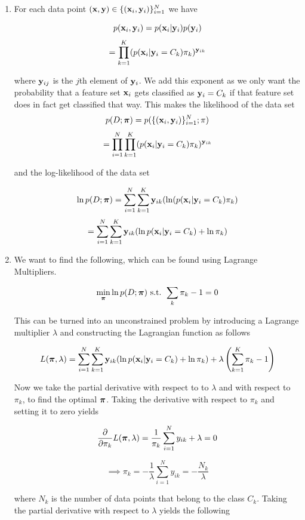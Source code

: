 \documentclass[submit]{harvardml}
\begin{document}
\begin{enumerate}
\item 

For each data point $(\mathbf{x}, \mathbf{y})\in \{(\mathbf{x}_i, \mathbf{y}_i)\}_{i=1}^N$
we have

$$p(\mathbf{x}_i, \mathbf{y}_i) = p(\mathbf{x}_i | \mathbf{y}_i )p(\mathbf{y}_i) $$
$$= \prod_{k=1}^K (p(\mathbf{x}_i | \mathbf{y}_i = C_k)\pi_k)^{\mathbf{y}_{ik}}$$

where $\mathbf{y}_{ij}$ is the $j$th element of $\mathbf{y}_i$. We add this exponent as we only 
want the probability that a feature set $\mathbf{x}_i$ gets classified as $\mathbf{y}_i = C_k$ if 
that feature set does in fact get classified that way. This makes the likelihood of the data set
$$p(D; \boldsymbol{\pi}) = p( \{(\mathbf{x}_i, \mathbf{y}_i)\}_{i=1}^N; \pi)$$
$$ = \prod_{i=1}^N\prod_{k=1}^K (p(\mathbf{x}_i | \mathbf{y}_i = C_k)\pi_k)^{\mathbf{y}_{ik}}$$

and the log-likelihood of the data set

$$\ln p(D; \boldsymbol{\pi}) = \sum_{i=1}^N \sum_{k=1}^K \mathbf{y}_{ik}(\ln (p(\mathbf{x}_i | \mathbf{y}_i = C_k)\pi_k)$$
$$ = \sum_{i=1}^N \sum_{k=1}^K \mathbf{y}_{ik}(\ln p(\mathbf{x}_i | \mathbf{y}_i = C_k) + \ln\pi_k)$$

\item 

We want to find the following, which can be found using Lagrange Multipliers.

$$\min_{\boldsymbol{\pi}} \ln p(D; \boldsymbol{\pi}) \text{ s.t. } \sum_k \pi_k -1 = 0$$

This can be turned into an unconstrained problem by introducing a Lagrange multiplier
$\lambda$ and constructing the Lagrangian function as follows

$$L(\boldsymbol{\pi}, \lambda) =
 \sum_{i=1}^N \sum_{k=1}^K \mathbf{y}_{ik}(\ln p(\mathbf{x}_i | \mathbf{y}_i = C_k) + \ln\pi_k)
 + \lambda \left(\sum_{k=1}^K \pi_k -1 \right) $$

Now we take the partial derivative with respect to to $
\lambda$ and with respect to $\pi_k$, to find the optimal $\boldsymbol{\pi}$.
Taking the derivative with respect to $\pi_k$ and setting it to zero yields

$$\frac{\partial }{\partial \pi_k} L(\boldsymbol{\pi}, \lambda) 
=  \frac{1}{\pi_k} \sum_{i=1}^N y_{ik} + \lambda = 0$$

$$\implies \pi_k = -\frac{1}{\lambda} \sum_{i=1}^N y_{ik} = -\frac{N_k}{\lambda}$$

where $N_k$ is the number of data points that belong to the class $C_k$. 
Taking the partial derivative with respect to $\lambda$ yields the following


\end{enumerate}
\end{document}
